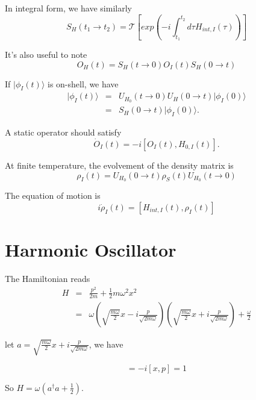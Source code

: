 \documentclass[12pt]{book}
\begin{document}
	In integral form, we have similarly
	\begin{equation}
		S_H(t_1\rightarrow t_2)=\mathcal T[exp(-i\int_{t_1}^{t_2}d\tau H_{int,I}(\tau))]
	\end{equation}
	
	It's also useful to note
	\begin{equation}
		O_H(t)=S_H(t\rightarrow 0)O_I(t)S_H(0\rightarrow t)
	\end{equation}
	
	If $|\phi_I(t)\rangle$ is on-shell, we have
	\begin{eqnarray}
		|\phi_I(t)\rangle &=&U_{H_0}(t\rightarrow 0)U_H(0\rightarrow t)|\phi_I(0)\rangle\\
		&=&S_H(0\rightarrow t)|\phi_I(0)\rangle.
	\end{eqnarray}	
	
	A static operator should satisfy
	\begin{equation}
		\dot O_I(t)=-i[O_I(t),H_{0,I}(t)].
	\end{equation}	
	
	At finite temperature, the evolvement of the density matrix is
	\begin{equation}
		\rho_I(t)=U_{H_0}(0\rightarrow t)\rho_S(t)U_{H_0}(t\rightarrow 0)
	\end{equation}
	
	The equation of motion is
	\begin{equation}
		i\dot\rho_I(t)=[H_{int,I}(t),\rho_I(t)]
	\end{equation}
	
	\section{Harmonic Oscillator}
	
	The Hamiltonian reads
	\begin{eqnarray}
		H&=&\frac{p^2}{2m}+\frac 12 m \omega^2 x^2\\
		&=&\omega(\sqrt{\frac {m\omega}2}x-i\frac p{\sqrt{2m\omega}})(\sqrt{\frac {m\omega}2}x+i\frac p{\sqrt{2m\omega}})+\frac\omega2
	\end{eqnarray}
	
	let $a=\sqrt{\frac {m\omega}2}x+i\frac p{\sqrt{2m\omega}}$, we have
	
	\begin{equation}
		[a,a^\dagger]=-i[x,p]=1
	\end{equation}
	
	So $H=\omega(a^\dagger a+\frac 12)$.
	
\end{document}

